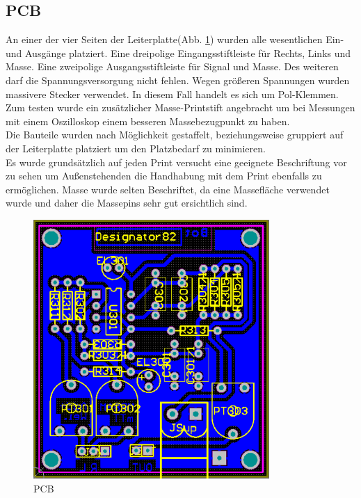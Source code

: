 \subsection{PCB}\label{kap:5.1.6}
An einer der vier Seiten der Leiterplatte(Abb. \ref{fig:abb5.1.6.1}) wurden alle wesentlichen Ein- und Ausgänge platziert. Eine dreipolige Eingangsstiftleiste für Rechts, Links und Masse. Eine zweipolige Ausgangsstiftleiste für Signal und Masse. Des weiteren darf die Spannungsversorgung nicht fehlen. Wegen größeren Spannungen wurden massivere Stecker verwendet. In diesem Fall handelt es sich um Pol-Klemmen. Zum testen wurde ein zusätzlicher Masse-Printstift angebracht um bei Messungen mit einem Oszilloskop einem besseren Massebezugpunkt zu haben.\\
Die Bauteile wurden nach Möglichkeit gestaffelt, beziehungsweise gruppiert auf der Leiterplatte platziert um den Platzbedarf zu minimieren.\\
Es wurde grundsätzlich auf jeden Print versucht eine geeignete Beschriftung vor zu sehen um Außenstehenden die Handhabung mit dem Print ebenfalls zu ermöglichen. Masse wurde selten Beschriftet, da eine Massefläche verwendet wurde und daher die Massepins sehr gut ersichtlich sind.
\begin{figure} [h]
	\centering
	\includegraphics[width=0.8\textwidth]{img/Print3/3mTTWeicheruAddierer-PCB.PNG}
	\caption{PCB}
	\label {fig:abb5.1.6.1}
\end{figure}





